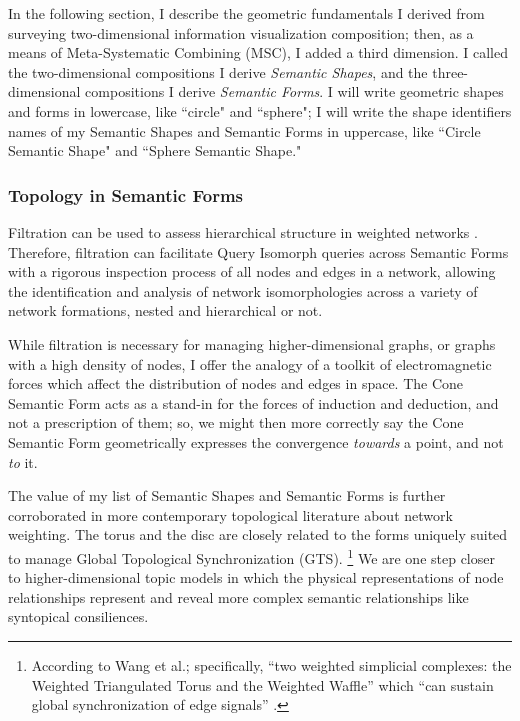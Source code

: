 In the following section, I describe the geometric fundamentals I derived from surveying two-dimensional information visualization composition; then, as a means of Meta-Systematic Combining (MSC), I added a third dimension. I called the two-dimensional compositions I derive \textit{Semantic Shapes}, and the three-dimensional compositions I derive \textit{Semantic Forms}. I will write geometric shapes and forms in lowercase, like ``circle" and ``sphere"; I will write the shape identifiers names of my Semantic Shapes and Semantic Forms in uppercase, like ``Circle Semantic Shape" and ``Sphere Semantic Shape."
   


\subsubsection{Topology in Semantic Forms}
Filtration can be used to assess hierarchical structure in weighted networks \citep[p. 11]{giusti_twos_2016}. Therefore, filtration can facilitate Query Isomorph queries across Semantic Forms with a rigorous inspection process of all nodes and edges in a network, allowing the identification and analysis of network isomorphologies across a variety of network formations, nested and hierarchical or not.
  

While filtration is necessary for managing higher-dimensional graphs, or graphs with a high density of nodes, I offer the analogy of a toolkit of electromagnetic forces which affect the distribution of nodes and edges in space. The Cone Semantic Form acts as a stand-in for the forces of induction and deduction, and not a prescription of them; so, we might then more correctly say the Cone Semantic Form geometrically expresses the convergence \textit{towards} a point, and not \textit{to} it.
  

The value of my list of Semantic Shapes and Semantic Forms is further corroborated in more contemporary topological literature about network weighting. The torus and the disc are closely related to the forms uniquely suited to manage Global Topological Synchronization (GTS). \footnote{According to Wang et al.; specifically, “two weighted simplicial complexes: the Weighted Triangulated Torus and the Weighted Waffle” which “can sustain global synchronization of edge signals” \citep[p. 9]{wang_global_2024}.} We are one step closer to higher-dimensional topic models in which the physical representations of node relationships represent and reveal more complex semantic relationships like syntopical consiliences.
     

